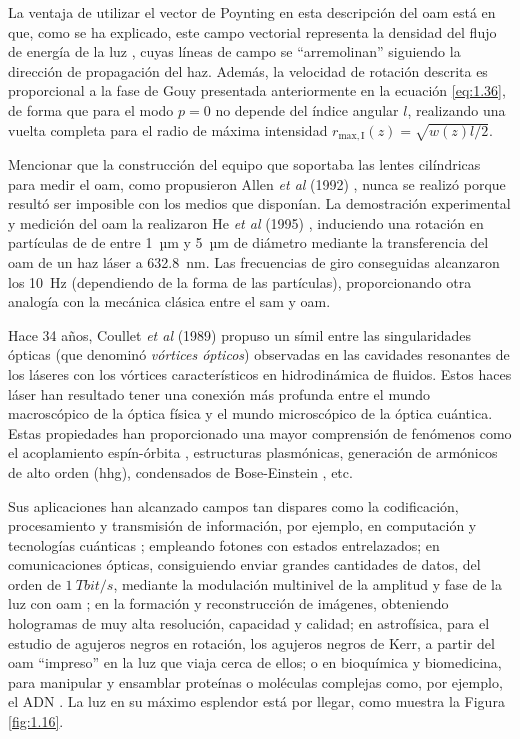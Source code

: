 La ventaja de utilizar el vector de Poynting en esta descripción del \acrshort{oam} está en que, como se ha explicado, este campo vectorial representa la densidad del flujo de energía de la luz \autocite{Griffiths2017,Jackson1998}, cuyas líneas de campo se \enquote{arremolinan} siguiendo la dirección de propagación del haz. Además, la velocidad de rotación descrita es proporcional \autocite{Padgett1995} a la fase de Gouy presentada anteriormente en la ecuación \eqref{eq:1.36}, de forma que para el modo $p=0$ no depende del índice angular $l$, realizando una vuelta completa para el radio de máxima intensidad $r_{\mathrm{max, I}}(z)=\sqrt{w(z)l/2}$.

Mencionar que la construcción del equipo que soportaba las lentes cilíndricas para medir el \acrshort{oam}, como propusieron Allen \emph{et al} (1992) \autocite{Allen1992}, nunca se realizó porque resultó ser imposible con los medios que disponían. La demostración experimental y medición del \acrshort{oam} la realizaron He \emph{et al} (1995) \autocite{He1995,Friese1996}, induciendo una rotación en partículas de  de entre \qty{1}{µm} y \qty{5}{µm} de diámetro mediante la transferencia del \acrshort{oam} de un haz láser  a \qty{632.8}{nm}. Las frecuencias de giro conseguidas alcanzaron los \qty{10}{Hz} (dependiendo de la forma de las partículas), proporcionando otra analogía \autocite{Simpson1997} con la mecánica clásica entre el \acrshort{sam} y \acrshort{oam}.

Hace 34 años, Coullet \emph{et al} (1989) \autocite{Coullet1989} propuso un símil entre las singularidades ópticas (que denominó \emph{vórtices ópticos}) observadas en las cavidades resonantes de los láseres con los vórtices característicos en hidrodinámica de fluidos. Estos haces láser han resultado tener una conexión más profunda entre el mundo macroscópico de la óptica física y el mundo microscópico de la óptica cuántica. Estas propiedades han proporcionado una mayor comprensión de fenómenos como el acoplamiento espín-órbita \autocite{Dorney2019,Bliokh2015}, estructuras plasmónicas\autocite{Zhang2018}, generación de armónicos de alto orden (\acrshort{hhg})\autocite{Zurch2012,Dorney2019,Gui2021}, condensados de Bose-Einstein \autocite{Aranson2002}, etc.

Sus aplicaciones han alcanzado campos tan dispares como la codificación, procesamiento y transmisión de información, por ejemplo, en computación y tecnologías cuánticas \autocite{Erhard2018}; empleando fotones con estados entrelazados; en comunicaciones ópticas, consiguiendo enviar grandes cantidades de datos, del orden de $\qty{1}{Tbit/s}$, mediante la modulación multinivel de la amplitud y fase de la luz con \acrshort{oam} \autocite{Wang2012}; en la formación y reconstrucción de imágenes, obteniendo hologramas de muy alta resolución, capacidad y calidad\autocite{Shi2023}; en astrofísica, para el estudio de agujeros negros en rotación, los agujeros negros de Kerr, \autocite{Tamburini2011} a partir del \acrshort{oam} \enquote{impreso} en la luz que viaja cerca de ellos; o en bioquímica y biomedicina, para manipular y ensamblar proteínas o moléculas complejas como, por ejemplo, el ADN \autocite{Zhuang2004}. La luz en su máximo esplendor está por llegar, como muestra la Figura \ref{fig:1.16}.

